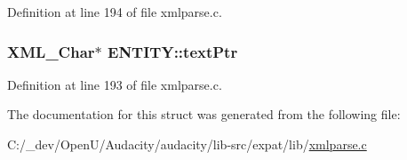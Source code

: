 Definition at line 194 of file xmlparse.\+c.

\subsubsection[{\texorpdfstring{text\+Ptr}{textPtr}}]{ {\bf X\+M\+L\+\_\+\+Char}$\ast$ E\+N\+T\+I\+T\+Y\+::text\+Ptr}\hypertarget{struct_e_n_t_i_t_y_a70490f298908d8db563aea7aac7bcfb5}{}\label{struct_e_n_t_i_t_y_a70490f298908d8db563aea7aac7bcfb5}


Definition at line 193 of file xmlparse.\+c.



The documentation for this struct was generated from the following file\+:\begin{DoxyCompactItemize}
\item 
C\+:/\+\_\+dev/\+Open\+U/\+Audacity/audacity/lib-\/src/expat/lib/\hyperlink{xmlparse_8c}{xmlparse.\+c}\end{DoxyCompactItemize}
